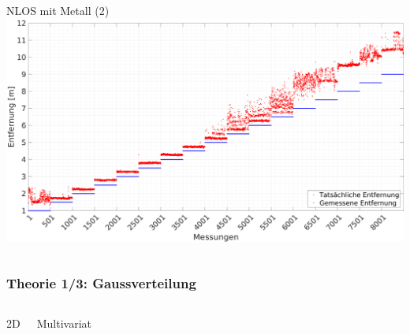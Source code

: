 \documentclass{beamer}
\begin{document}
\begin{frame}
\begin{columns}
			NLOS mit Metall (2)
			\includegraphics[scale=0.14]{entfernungsmessung_2018_01_20_nlos_metal2}
	\end{columns}
\end{frame}

%
% 
%
\begin{frame}
	\frametitle{Theorie 1/3: Gaussverteilung}
	\begin{columns}
			\centering
			2D
		
			\centering
			Multivariat
	\end{columns}
\end{frame}
\end{document}
